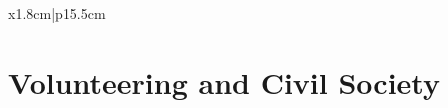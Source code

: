 \documentclass[a4paper,10pt]{article}
\newcommand{\datelen}{1.8cm}
\newcommand{\descrlen}{15.5cm}
\begin{document}
\begin{tabular}{x{\datelen}|p{\descrlen}}
\begin{comment}
  \textsc{Dec 2012}&\footnotesize{Helped foundation year students understand basic programming concepts, and evaluated their performance in assignments.}\\\multicolumn{2}{c}{}\\[-0.2cm]
  \textsc{Sep 2010} to& \textbf{Software Workshop (Java) Demonstrator} at \textsc{University of Birmingham}\\
  \textsc{Apr 2011}&\footnotesize{One of five second year students selected to demonstrate for the First Year Workshop Java module. Provided advice on assignments, programming concepts, and the Java API.}\\
  \end{comment}
\end{tabular}

\section{Volunteering and Civil Society}
\end{document}

